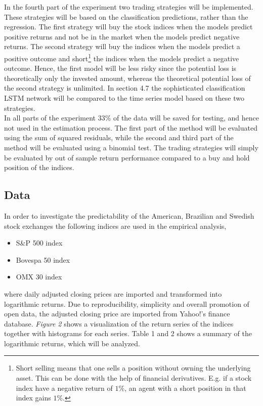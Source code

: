\documentclass[12pt, letterpaper]{amsart}%
\begin{document}
In the fourth part of the experiment two trading strategies will be implemented. These strategies will be based on the classification predictions, rather than the regression. The first strategy will buy the stock indices when the models predict positive returns and not be in the market when the models predict negative returns. The second strategy will buy the indices when the models predict a positive outcome and short\footnote{Short selling means that one sells a position without owning the underlying asset. This can be done with the help of financial derivatives. E.g. if a stock index have a negative return of $1\%$, an agent with a short position in that index gains $1\%$.} the indices when the models predict a negative outcome. Hence, the first model will be less risky since the potential loss is theoretically only the invested amount, whereas the theoretical potential loss of the second strategy is unlimited. In section 4.7 the sophisticated classification LSTM network will be compared to the time series model based on these two strategies.
\\

In all parts of the experiment 33\% of the data will be saved for testing, and hence not used in the estimation process. The first part of the method will be evaluated using the sum of squared residuals, while the second and third part of the method will be evaluated using a binomial test. The trading strategies will simply be evaluated by out of sample return performance compared to a buy and hold position of the indices.

\subsection{Data}
In order to investigate the predictability of the American, Brazilian and Swedish stock exchanges the following indices are used in the empirical analysis,
\\

\begin{itemize}
\item S\&P 500 index
\item Bovespa 50 index
\item OMX 30 index
\end{itemize}
\vspace{0.5cm}

where daily adjusted closing prices are imported and transformed into logarithmic returns. Due to reproducibility, simplicity and overall promotion of open data, the adjusted closing price are imported from Yahoo!'s finance database. \textit{Figure 2} shows a visualization of the return series of the indices together with histograms for each series. Table 1 and 2 shows a summary of the logarithmic returns, which will be analyzed.
\\
\end{document}

